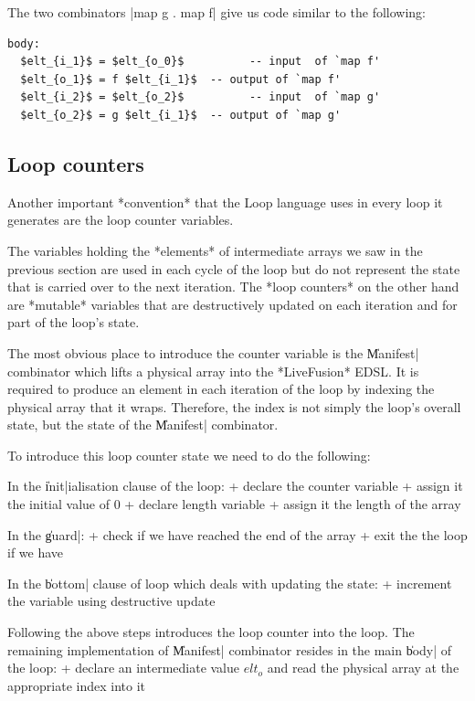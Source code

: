 \documentclass[preamble.tex]{subfiles}
\begin{document}
The two combinators |map g . map f| give us code similar to the following:

\begin{lstlisting}[mathescape]
body:
  $elt_{i_1}$ = $elt_{o_0}$          -- input  of `map f'
  $elt_{o_1}$ = f $elt_{i_1}$  -- output of `map f'
  $elt_{i_2}$ = $elt_{o_2}$          -- input  of `map g'
  $elt_{o_2}$ = g $elt_{i_1}$  -- output of `map g'
\end{lstlisting}

\subsection{Loop counters}

Another important *convention* that the Loop language uses in every loop it generates are the loop counter variables.

The variables holding the *elements* of intermediate arrays we saw in the previous section are used in each cycle of the loop but do not represent the state that is carried over to the next iteration. The *loop counters* on the other hand are *mutable* variables that are destructively updated on each iteration and for part of the loop's state.

The most obvious place to introduce the counter variable is the \|Manifest| combinator which lifts a physical array into the *LiveFusion* EDSL. It is required to produce an element in each iteration of the loop by indexing the physical array that it wraps. Therefore, the index is not simply the loop's overall state, but the state of the \|Manifest| combinator.

To introduce this loop counter state we need to do the following:

In the \|init|ialisation clause of the loop:
+ declare the counter variable
+ assign it the initial value of 0
+ declare length variable
+ assign it the length of the array

In the \|guard|:
+ check if we have reached the end of the array
+ exit the the loop if we have

In the \|bottom| clause of loop which deals with updating the state:
+ increment the variable using destructive update

Following the above steps introduces the loop counter into the loop. The remaining implementation of \|Manifest| combinator resides in the main \|body| of the loop:
+ declare an intermediate value $elt_o$ and read the physical array at the appropriate index into it
\end{document}
